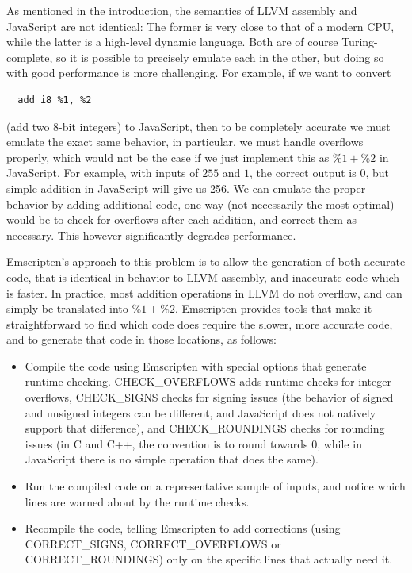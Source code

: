 \documentclass[preprint,10pt]{sigplanconf}
\begin{document}
As mentioned in the introduction, the semantics of LLVM assembly and JavaScript are not identical: The former
is very close to that of a modern CPU, while the latter is a high-level
dynamic language. Both are of course Turing-complete, so it is possible to
precisely emulate each in the other, but doing so with good performance is
more challenging. For example, if we want to convert
\begin{verbatim}
  add i8 %1, %2
\end{verbatim}
(add two 8-bit integers) to JavaScript, then to be completely accurate we must emulate the
exact same behavior, in particular, we must handle overflows properly, which would not be the case if we just implement
this as $\%1 + \%2$ in JavaScript. For example, with inputs of $255$ and $1$, the
correct output is 0, but simple addition in JavaScript will give us 256. We
can emulate the proper behavior by adding additional code, one way
(not necessarily the most optimal) would be to check for overflows after
each addition, and correct them as necessary. This however significantly degrades performance.

Emscripten's approach to this problem is to allow the generation of both accurate code,
that is identical in behavior to LLVM assembly, and inaccurate code which is
faster. In practice, most addition operations in LLVM do not overflow,
and can simply be translated into $\%1 + \%2$. Emscripten
provides tools that make it straightforward to find which code does require
the slower, more accurate code, and to generate that code in those locations, as follows:
\begin{itemize}
\item Compile the code using Emscripten with special options that generate runtime checking.
      CHECK\_OVERFLOWS adds runtime checks for integer overflows, CHECK\_SIGNS
      checks for signing issues (the behavior of signed and unsigned integers can
      be different, and JavaScript does not natively support that difference), and
      CHECK\_ROUNDINGS checks for rounding issues (in C and C++, the convention is
      to round towards 0, while in JavaScript there is no simple operation that does
      the same).
\item Run the compiled code on a representative sample of inputs, and notice which
      lines are warned about by the runtime checks.
\item Recompile the code, telling Emscripten to add corrections (using CORRECT\_SIGNS, CORRECT\_OVERFLOWS
      or CORRECT\_ROUNDINGS) only on the specific lines that actually need it.
\end{itemize}
\end{document}
